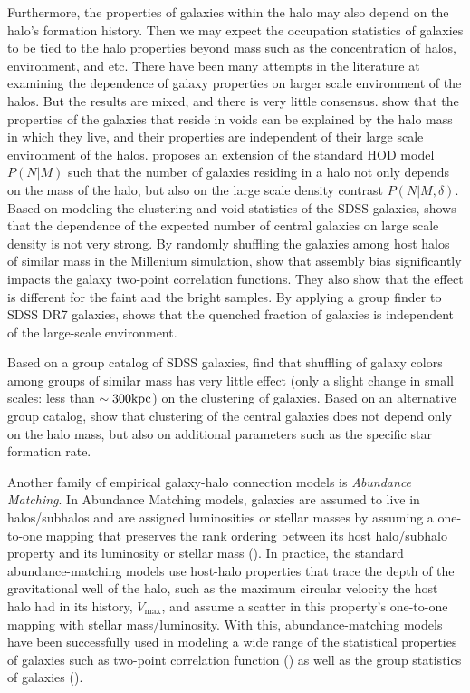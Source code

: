 Furthermore, the properties of galaxies within the halo may also depend on the halo's formation history. Then we may expect the occupation statistics of galaxies to be tied to the halo properties beyond mass such as the concentration of halos, environment, and etc. There have been many attempts in the literature at examining the dependence of galaxy properties on larger scale environment of the halos. But the results are mixed, and there is very little consensus. \citet{tinker_void_2009} show that the properties of the galaxies that reside in voids can be explained by the halo mass in which they live, and their properties are independent of their large scale environment of the halos. \citealt{tinker_density_hod} proposes an extension of the standard HOD model $P(N|M)$ such that the number of galaxies residing in a halo not only depends on the mass of the halo, but also on the large scale density contrast $P(N|M,\delta)$. Based on modeling the clustering and void statistics of the SDSS galaxies, \citealt{tinker_vpf_2008} shows that the dependence of the expected number of central galaxies on large scale density is not very strong.    
By randomly shuffling the galaxies among host halos of similar mass in the Millenium simulation, \citealt{croton2007} show that assembly bias significantly impacts the galaxy two-point correlation functions. They also show that the effect is different for the faint and the bright samples. By applying a group finder to SDSS DR7 galaxies, \citealt{tinker2011} shows that the quenched fraction of galaxies is independent of the large-scale environment. 

Based on a group catalog of SDSS galaxies, \citet{blanton_group_2007} find that shuffling of galaxy colors among groups of similar mass has very little effect (only a slight change in small scales: less than $\sim 300 \rm{kpc}$) on the clustering of galaxies. Based on an alternative group catalog, \citet{wang2013} show that clustering of the central galaxies does not depend only on the halo mass, but also on additional parameters such as the specific star formation rate.

Another family of empirical galaxy-halo connection models is \emph{Abundance} \emph{Matching}. In Abundance Matching models, galaxies are assumed to live in halos/subhalos and are assigned luminosities or stellar masses by assuming a one-to-one mapping that preserves the rank ordering between its host halo/subhalo property and its luminosity or stellar mass
(\citealt{kravtsov2004,vale2004,tasitsiomi2004,conroy2009,guo2010,wetzel2010,Neisten2011,watson2012,rodriguez2012,kravstov2013,mao2015,chavez2016}). 
In practice, the standard abundance-matching models use host-halo properties 
that trace the depth of the gravitational well of the halo, such as 
the maximum circular velocity the host halo had in its history, $V_\mathrm{max}$, 
and assume a scatter in this property's one-to-one mapping with 
stellar mass/luminosity. With this, 
abundance-matching models have been successfully used in modeling a wide range of the 
statistical properties of galaxies such as two-point correlation function (\citealt{reddick2013,lehman2015,hod_vs_sham}) as well as the group statistics of galaxies (\citealt{sham_gmf}). 


